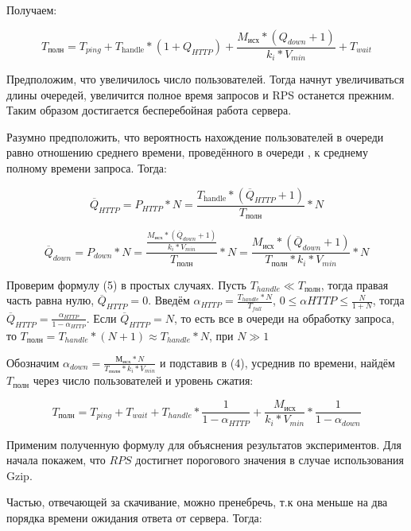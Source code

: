 \documentclass[12pt]{article}
\begin{document}
Получаем:

\[
    T_{\text{полн}} = T_{ping} + T_{\text{handle}}*(1 + Q_{HTTP}) + \frac{M_{\text{исх}}*(Q_{down} + 1)}{k_{i}*V_{min}} + T_{wait}
\]

Предположим, что увеличилось число пользователей. Тогда начнут увеличиваться длины очередей, увеличится полное время запросов
и RPS останется прежним. Таким образом достигается бесперебойная работа сервера.

Разумно предположить, что вероятность нахождение пользователей в очереди равно отношению среднего времени, проведённого в очереди
, к среднему полному времени запроса. Тогда:

\begin{equation}
    \overline{Q}_{HTTP} = P_{HTTP} * N = \frac{T_{\text{handle}} * (\overline{Q}_{HTTP} + 1)}{T_{\text{полн}}} * N
\end{equation}

\begin{equation}
    \overline{Q}_{down} = P_{down} * N = \frac{\frac{M_{\text{исх}}*(\overline{Q}_{down} + 1)}{k_{i}*V_{min}}}{T_{\text{полн}}} * N = \frac{M_{\text{исх}}*(\overline{Q}_{down} + 1)}{T_{\text{полн}} * k_{i}*V_{min}} * N
\end{equation}

Проверим формулу (5) в простых случаях. Пусть $T_{handle} \ll T_{\text{полн}}$, тогда правая часть равна нулю, $\overline{Q}_{HTTP} = 0$.
Введём $\alpha_{HTTP} = \frac{T_{handle} * N}{T_{full}}$, $0 \le \alpha{HTTP} \le \frac{N}{1+N}$, тогда $\overline{Q}_{HTTP} = \frac{\alpha_{HTTP}}{1 - \alpha_{HTTP}}$.
Если $\overline{Q}_{HTTP} = N$, то есть все в очереди на обработку запроса,
то $T_{\text{полн}} = T_{handle}*(N+1) \approx T_{handle}*N$, при  $N \gg 1$

Обозначим $\alpha_{down} = \frac{М_{\text{исх}} * N}{T_{\text{полн}}*k_{i}*V_{min}}$ и подставив в (4),
усреднив по времени, найдём $T_{\text{полн}}$ через число пользователей и уровень сжатия:

\begin{equation}
    T_{\text{полн}} = T_{ping} + T_{wait} + T_{handle}*\frac{1}{1 - \alpha_{HTTP}} + \frac{M_{\text{исх}}}{k_{i}*V_{min}} * \frac{1}{1 - \alpha_{down}}
\end{equation}

Применим полученную формулу для объяснения результатов экспериментов. Для начала покажем, что $RPS$ достигнет порогового значения в случае использования Gzip.

Частью, отвечающей за скачивание, можно пренебречь, т.к она меньше на два порядка времени ожидания ответа от сервера. Тогда:
\end{document}
